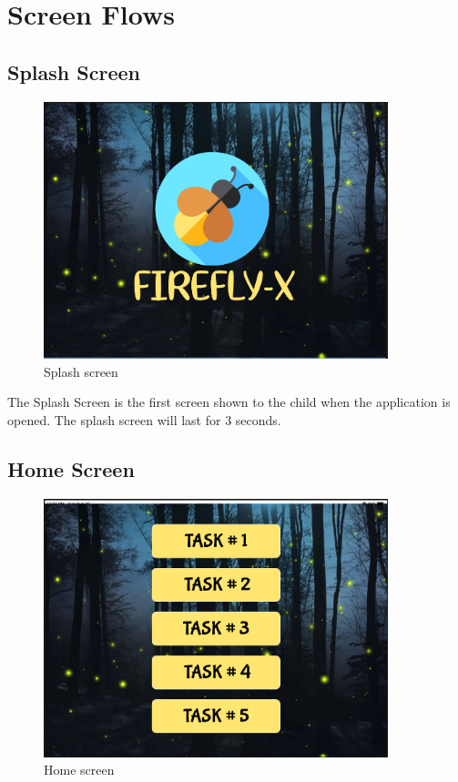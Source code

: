 \section{Screen Flows}
\label{sec: it3results}


\subsection{Splash Screen}

\begin{figure}[H]
    \centering
    \includegraphics[width=10cm]{figures/newScreenFlows/newSplash.png}
    \caption{Splash screen}
    \label{fig:splash}
\end{figure}

The Splash Screen is the first screen shown to the child when the application is opened. The splash screen will last for 3 seconds.

\subsection{Home Screen}

\begin{figure}[H]
    \centering
    \includegraphics[width=10cm]{figures/newScreenFlows/newMain.png}
    \caption{Home screen}
    \label{fig:newhome}
\end{figure}


